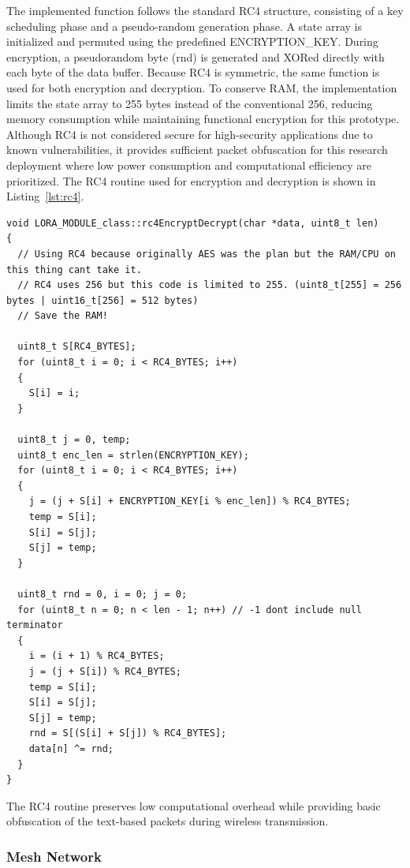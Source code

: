 The implemented function follows the standard RC4 structure, consisting
of a key scheduling phase and a pseudo-random generation phase. A state
array is initialized and permuted using the predefined ENCRYPTION\_KEY.
During encryption, a pseudorandom byte (rnd) is generated and XORed
directly with each byte of the data buffer. Because RC4 is symmetric,
the same function is used for both encryption and decryption. To
conserve RAM, the implementation limits the state array to 255 bytes
instead of the conventional 256, reducing memory consumption while
maintaining functional encryption for this prototype. Although RC4 is
not considered secure for high-security applications due to known
vulnerabilities, it provides sufficient packet obfuscation for this
research deployment where low power consumption and computational
efficiency are prioritized. The RC4 routine used for encryption and decryption is shown in Listing~\ref{lst:rc4}.

\begin{lstlisting}[caption={RC4-based packet encryption routine implemented for lightweight mesh communication security.},label={lst:rc4},basicstyle=\normalsize\ttfamily,captionpos=b]
void LORA_MODULE_class::rc4EncryptDecrypt(char *data, uint8_t len)
{
  // Using RC4 because originally AES was the plan but the RAM/CPU on this thing cant take it.
  // RC4 uses 256 but this code is limited to 255. (uint8_t[255] = 256 bytes | uint16_t[256] = 512 bytes)
  // Save the RAM!

  uint8_t S[RC4_BYTES];
  for (uint8_t i = 0; i < RC4_BYTES; i++)
  {
    S[i] = i;
  }

  uint8_t j = 0, temp;
  uint8_t enc_len = strlen(ENCRYPTION_KEY);
  for (uint8_t i = 0; i < RC4_BYTES; i++)
  {
    j = (j + S[i] + ENCRYPTION_KEY[i % enc_len]) % RC4_BYTES;
    temp = S[i];
    S[i] = S[j];
    S[j] = temp;
  }

  uint8_t rnd = 0, i = 0; j = 0;
  for (uint8_t n = 0; n < len - 1; n++) // -1 dont include null terminator
  {
    i = (i + 1) % RC4_BYTES;
    j = (j + S[i]) % RC4_BYTES;
    temp = S[i];
    S[i] = S[j];
    S[j] = temp;
    rnd = S[(S[i] + S[j]) % RC4_BYTES];
    data[n] ^= rnd;
  }
}
\end{lstlisting}

The RC4 routine preserves low computational overhead while providing basic obfuscation of the text-based packets during wireless transmission.

\subsubsection{Mesh Network}


